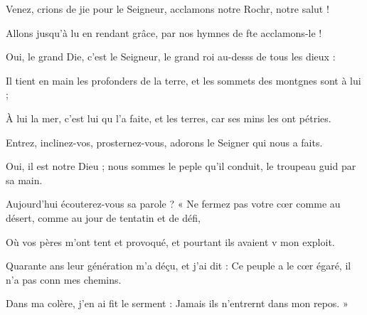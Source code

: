 \item Venez, crions de jie pour le Seigneur,\psstar{} acclamons notre Rochr, notre salut !
\item Allons jusqu’à lu en rendant grâce,\psstar{} par nos hymnes de fte acclamons-le !
\item Oui, le grand Die, c’est le Seigneur,\psstar{} le grand roi au-desss de tous les dieux :
\item Il tient en main les profonders de la terre,\psstar{} et les sommets des montgnes sont à lui ;
\item À lui la mer, c’est lui qu l’a faite,\psstar{} et les terres, car ses mins les ont pétries.
\item Entrez, inclinez-vos, prosternez-vous,\psstar{} adorons le Seigner qui nous a faits.
\item Oui, il est notre Dieu ;\pscross{} nous sommes le peple qu’il conduit,\psstar{} le troupeau guid par sa main.
\item Aujourd’hui écouterez-vous sa parole ?\pscross{} « Ne fermez pas votre cœr comme au désert,\psstar{} comme au jour de tentatin et de défi,
\item Où vos pères m’ont tent et provoqué,\psstar{} et pourtant ils avaient v mon exploit.
\item Quarante ans leur génération m’a déçu,\pscross{} et j’ai dit : Ce peuple a le cœr égaré,\psstar{} il n’a pas conn mes chemins.
\item Dans ma colère, j’en ai fit le serment :\psstar{} Jamais ils n’entrernt dans mon repos. »